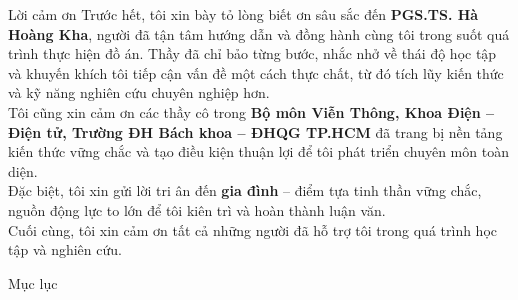 \begin{frame}{Lời cảm ơn}
\small
Trước hết, tôi xin bày tỏ lòng biết ơn sâu sắc đến 
\textbf{PGS.TS. Hà Hoàng Kha}, người đã tận tâm hướng dẫn và đồng hành cùng tôi 
trong suốt quá trình thực hiện đồ án. Thầy đã chỉ bảo từng bước, nhắc nhở về 
thái độ học tập và khuyến khích tôi tiếp cận vấn đề một cách thực chất, từ đó 
tích lũy kiến thức và kỹ năng nghiên cứu chuyên nghiệp hơn. \\[0.3cm]

Tôi cũng xin cảm ơn các thầy cô trong 
\textbf{Bộ môn Viễn Thông, Khoa Điện – Điện tử, Trường ĐH Bách khoa – ĐHQG TP.HCM} 
đã trang bị nền tảng kiến thức vững chắc và tạo điều kiện thuận lợi để tôi phát triển 
chuyên môn toàn diện. \\[0.3cm]

Đặc biệt, tôi xin gửi lời tri ân đến \textbf{gia đình} – điểm tựa tinh thần vững chắc, 
nguồn động lực to lớn để tôi kiên trì và hoàn thành luận văn. \\[0.3cm]

Cuối cùng, tôi xin cảm ơn tất cả những người đã hỗ trợ tôi trong quá trình học tập và nghiên cứu.
\end{frame}


\begin{frame}{Mục lục}
    \tableofcontents[hideallsubsections]
\end{frame}
